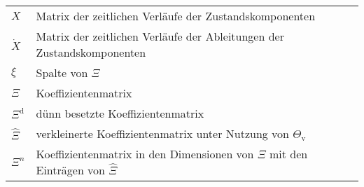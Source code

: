 \begin{table}[htbp]
\begin{tabular}{llp{9 cm}}
$X$ & Matrix der zeitlichen Verläufe der Zustandskomponenten\\
$\dot{X}$ & Matrix der zeitlichen Verläufe der Ableitungen der Zustandskomponenten\\
$\xi$ & Spalte von $\Xi$\\
$\Xi$ & Koeffizientenmatrix\\
$\Xi^\text{d}$ & dünn besetzte Koeffizientenmatrix\\
$\hat{\Xi}$ & verkleinerte Koeffizientenmatrix unter Nutzung von $\Theta_\text{v}$\\
$\Xi^n$ & Koeffizientenmatrix in den Dimensionen von $\Xi$ mit den Einträgen von $\hat{\Xi}$\\

\end{tabular}
\end{table}